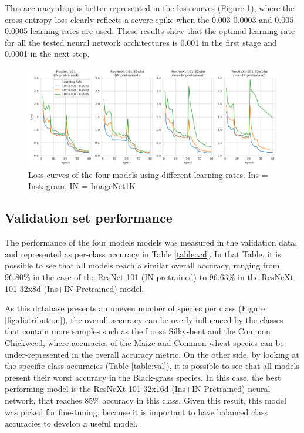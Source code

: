 \documentclass[10pt,onecolumn,titlepage,letterpaper]{article}
\begin{document}
This accuracy drop is better represented in the loss curves (Figure \ref{fig:loss}), where the cross entropy loss clearly reflects a severe spike when the 0.003-0.0003 and 0.005-0.0005 learning rates are used. These results show that the optimal learning rate for all the tested neural network architectures is 0.001 in the first stage and 0.0001 in the next step.

\begin{figure}[h]
	\begin{center}
		\includegraphics[width=1.0\linewidth]{loss_4models.pdf}
	\end{center}
	\caption{Loss curves of the four models using different learning rates. Ins = Instagram, IN = ImageNet1K}
	\label{fig:loss}
\end{figure}

\subsection{Validation set performance}

The performance of the four models models was measured in the validation data, and represented as per-class accuracy in Table \ref{table:val}. In that Table, it is possible to see that all models reach a similar overall accuracy, ranging from 96.80\% in the case of the ResNet-101 (IN pretrained) to 96.63\% in the ResNeXt-101 32x8d (Ins+IN Pretrained) model.

As this database presents an uneven number of species per class (Figure \ref{fig:distribution}), the overall accuracy can be overly influenced by the classes that contain more samples such as the Loose Silky-bent and the Common Chickweed, where accuracies of the Maize and Common wheat species can be under-represented in the overall accuracy metric. On the other side, by looking at the specific class accuracies (Table \ref{table:val}), it is possible to see that all models present their worst accuracy in the Black-grass species. In this case, the best performing model is the ResNeXt-101 32x16d (Ins+IN Pretrained) neural network, that reaches 85\% accuracy in this class. Given this result, this model was picked for fine-tuning, because it is important to have balanced class accuracies to develop a useful model.
\end{document}
